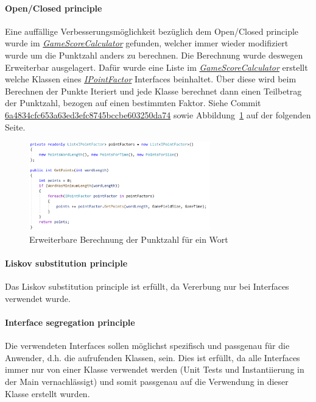 \paragraph{Open/Closed principle}
Eine auffällige Verbesserungsmöglichkeit bezüglich dem Open/Closed principle wurde im \href{https://github.com/EinToni/Wortfinder/blob/main/Wortfinder/GameScoreCalculator.cs}{\textit{GameScoreCalculator}} gefunden, welcher immer wieder modifiziert wurde um die Punktzahl anders zu berechnen. Die Berechnung wurde deswegen Erweiterbar ausgelagert. Dafür wurde eine Liste im \href{https://github.com/EinToni/Wortfinder/blob/main/Wortfinder/GameScoreCalculator.cs}{\textit{GameScoreCalculator}} erstellt welche Klassen eines \href{https://github.com/EinToni/Wortfinder/blob/main/Wortfinder/Interfaces/IPointFactor.cs}{\textit{IPointFactor}} Interfaces beinhaltet. Über diese wird beim Berechnen der Punkte Iteriert und jede Klasse berechnet dann einen Teilbetrag der Punktzahl, bezogen auf einen bestimmten Faktor. Siehe Commit \href{https://github.com/EinToni/Wortfinder/commit/6a4834cfc653a63ed3efc8745bccbe603250da74}{6a4834cfc653a63ed3efc8745bccbe603250da74} sowie Abbildung~\ref{Abb:openClosedExample} auf der folgenden Seite.

\begin{figure}[!htb]
\centering
\includegraphics[width=0.7\textwidth]{Bilder/openClosedExample.PNG}
\caption{\label{Abb:openClosedExample}Erweiterbare Berechnung der Punktzahl für ein Wort}
\end{figure}

\paragraph{Liskov substitution principle}
Das Liskov substitution principle ist erfüllt, da Vererbung nur bei Interfaces verwendet wurde.

\paragraph{Interface segregation principle}
Die verwendeten Interfaces sollen möglichst spezifisch und \glqq passgenau\grqq{} für die Anwender, d.h. die aufrufenden Klassen, sein. Dies ist erfüllt, da alle Interfaces immer nur von einer Klasse verwendet werden (Unit Tests und Instantiierung in der Main vernachlässigt) und somit passgenau auf die Verwendung in dieser Klasse erstellt wurden.


